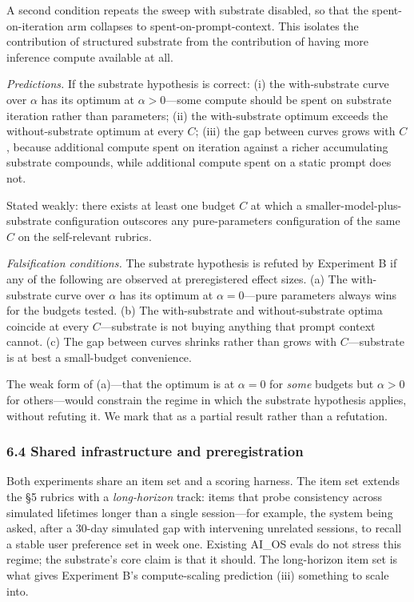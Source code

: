\documentclass[11pt,letterpaper]{article}
\begin{document}
A second condition repeats the sweep with substrate disabled, so that the spent-on-iteration arm collapses to spent-on-prompt-context. This isolates the contribution of structured substrate from the contribution of having more inference compute available at all.

\emph{Predictions.} If the substrate hypothesis is correct: (i) the with-substrate curve over $\alpha$ has its optimum at $\alpha > 0$---some compute should be spent on substrate iteration rather than parameters; (ii) the with-substrate optimum exceeds the without-substrate optimum at every $C$; (iii) the gap between curves grows with $C$, because additional compute spent on iteration against a richer accumulating substrate compounds, while additional compute spent on a static prompt does not.

Stated weakly: there exists at least one budget $C$ at which a smaller-model-plus-substrate configuration outscores any pure-parameters configuration of the same $C$ on the self-relevant rubrics.

\emph{Falsification conditions.} The substrate hypothesis is refuted by Experiment B if any of the following are observed at preregistered effect sizes. (a) The with-substrate curve over $\alpha$ has its optimum at $\alpha = 0$---pure parameters always wins for the budgets tested. (b) The with-substrate and without-substrate optima coincide at every $C$---substrate is not buying anything that prompt context cannot. (c) The gap between curves shrinks rather than grows with $C$---substrate is at best a small-budget convenience.

The weak form of (a)---that the optimum is at $\alpha = 0$ for \emph{some} budgets but $\alpha > 0$ for others---would constrain the regime in which the substrate hypothesis applies, without refuting it. We mark that as a partial result rather than a refutation.

\subsubsection*{6.4 Shared infrastructure and preregistration}

Both experiments share an item set and a scoring harness. The item set extends the §5 rubrics with a \emph{long-horizon} track: items that probe consistency across simulated lifetimes longer than a single session---for example, the system being asked, after a 30-day simulated gap with intervening unrelated sessions, to recall a stable user preference set in week one. Existing AI\_OS evals do not stress this regime; the substrate's core claim is that it should. The long-horizon item set is what gives Experiment B's compute-scaling prediction (iii) something to scale into.
\end{document}
